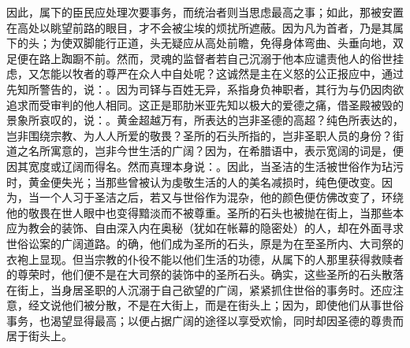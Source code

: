因此，属下的臣民应处理次要事务，而统治者则当思虑最高之事；如此，那被安置在高处以眺望前路的眼目，才不会被尘埃的烦扰所遮蔽。因为凡为首者，乃是其属下的头；为使双脚能行正道，头无疑应从高处前瞻，免得身体弯曲、头垂向地，双足便在路上踟蹰不前。然而，灵魂的监督者若自己沉溺于他本应谴责他人的俗世挂虑，又怎能以牧者的尊严在众人中自处呢？这诚然是主在义怒的公正报应中，通过先知所警告的，说：。因为司铎与百姓无异，系指身负神职者，其行为与仍因肉欲追求而受审判的他人相同。这正是耶肋米亚先知以极大的爱德之痛，借圣殿被毁的景象所哀叹的，说：。黄金超越万有，所表达的岂非圣德的高超？纯色所表达的，岂非围绕宗教、为人人所爱的敬畏？圣所的石头所指的，岂非圣职人员的身份？街道之名所寓意的，岂非今世生活的广阔？因为，在希腊语中，表示宽阔的词是，便因其宽度或辽阔而得名。然而真理本身说：。因此，当圣洁的生活被世俗作为玷污时，黄金便失光；当那些曾被认为虔敬生活的人的美名减损时，纯色便改变。因为，当一个人习于圣洁之后，若又与世俗作为混杂，他的颜色便仿佛改变了，环绕他的敬畏在世人眼中也变得黯淡而不被尊重。圣所的石头也被抛在街上，当那些本应为教会的装饰、自由深入内在奥秘（犹如在帐幕的隐密处）的人，却在外面寻求世俗讼案的广阔道路。的确，他们成为圣所的石头，原是为在至圣所内、大司祭的衣袍上显现。但当宗教的仆役不能以他们生活的功德，从属下的人那里获得救赎者的尊荣时，他们便不是在大司祭的装饰中的圣所石头。确实，这些圣所的石头散落在街上，当身居圣职的人沉溺于自己欲望的广阔，紧紧抓住世俗的事务时。还应注意，经文说他们被分散，不是在大街上，而是在街头上；因为，即使他们从事世俗事务，也渴望显得最高；以便占据广阔的途径以享受欢愉，同时却因圣德的尊贵而居于街头上。\par

